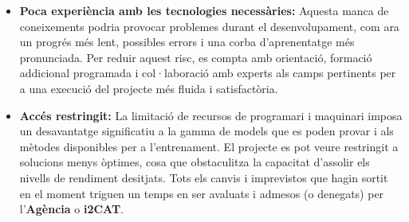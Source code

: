 \begin{itemize}
    \item \textbf{Poca experiència amb les tecnologies necessàries:} Aquesta manca de coneixements podria provocar problemes durant el desenvolupament, com ara un progrés més lent, possibles errors i una corba d'aprenentatge més pronunciada. Per reduir aquest risc, es compta amb orientació, formació addicional programada i col·laboració amb experts als camps pertinents per a una execució del projecte més fluida i satisfactòria.
    \item \textbf{Accés restringit:} La limitació de recursos de programari i maquinari imposa un desavantatge significatiu a la gamma de models que es poden provar i als mètodes disponibles per a l'entrenament. El projecte es pot veure restringit a solucions menys òptimes, cosa que obstaculitza la capacitat d'assolir els nivells de rendiment desitjats. Tots els canvis i imprevistos que hagin sortit en el moment triguen un temps en ser avaluats i admesos (o denegats) per l'\textbf{Agència} o \textbf{i2CAT}.
\end{itemize}
